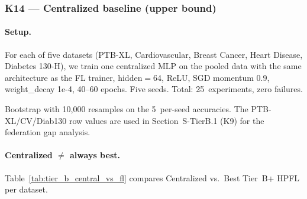 \documentclass[conference]{IEEEtran}
\begin{document}
\subsubsection*{K14 --- Centralized baseline (upper bound)}

\paragraph{Setup.} For each of five datasets (PTB-XL, Cardiovascular, Breast Cancer, Heart Disease, Diabetes 130-H), we train one centralized MLP on the pooled data with the same architecture as the FL trainer, hidden$=$64, ReLU, SGD momentum 0.9, weight\_decay 1e-4, 40--60 epochs. Five seeds. Total: 25~experiments, zero failures.

\begin{table}[htbp]
\centering
\caption{Centralized baseline on 5~datasets, 5~seeds. Mean$\pm$std and bootstrap 95\% confidence interval reported. The MLP architecture is identical to the FL trainer (fair comparison).}
\label{tab:tier_b_central}
\small
\setlength{\tabcolsep}{6pt}

\vspace{1mm}
\footnotesize{Bootstrap with 10{,}000 resamples on the 5~per-seed accuracies. The PTB-XL/CV/Diab130 row values are used in Section~S-TierB.1 (K9) for the federation gap analysis.}
\end{table}

\paragraph{Centralized $\neq$ always best.} Table~\ref{tab:tier_b_central_vs_fl} compares Centralized vs.\ Best Tier~B+ HPFL per dataset.
\end{document}
